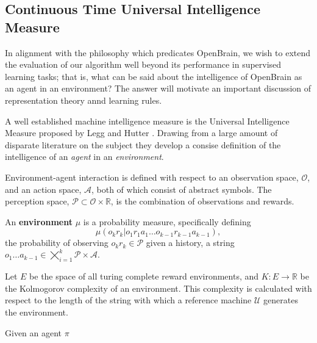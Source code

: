 \subsection{Continuous Time Universal Intelligence Measure}

In alignment with the philosophy which predicates OpenBrain, we wish to extend the evaluation of our algorithm well beyond its performance in supervised learning tasks; that is, what can be said about the intelligence of OpenBrain as an agent in an environment? The answer will motivate an important discussion of representation theory annd learning rules.

A well established\cite{legg2008machine, mnih2015human, rathmanner2011philosophical}  machine intelligence measure is the Universal Intelligence Measure proposed by Legg and Hutter \cite{legg2007universal}. Drawing from a large amount of disparate literature on the subject they develop a consise definition of the intelligence of an \emph{agent} in an \emph{environment}. 

Environment-agent interaction is defined with respect to an observation space, $\mathcal{O}$, and an action space, $\mathcal{A}$, both of which consist of abstract symbols. The perception space, $\mathcal{P} \subset \mathcal{O} \times \mathbb{R}$, is the combination of observations and rewards.
\begin{definition}
	An \textbf{environment} $\mu$ is a probability measure, specifically defining
	\begin{equation}
			\mu(o_kr_k | o_1r_1a_1 \dots o_{k-1}r_{k-1}a_{k-1}),
	\end{equation}
	the probability of observing $o_kr_k \in \mathcal{P}$ given a history, a string $o_1\dots a_{k-1} \in \bigtimes_{i=1}^k \mathcal{P} \times \mathcal{A}.$
\end{definition}
Let $E$ be the space of all turing complete reward environments, and $K: E \to  \mathbb{R}$ be the Kolmogorov complexity of an environment. This complexity is calculated with respect to the length of the string with which a reference machine $\mathcal{U}$ generates the environment.
\begin{definition}
	Given an agent $\pi$
\end{definition}
\
